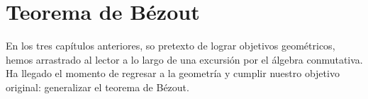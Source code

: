 \chapter{Teorema de Bézout}

\noindent En los tres capítulos anteriores, so pretexto de lograr objetivos geométricos, hemos arrastrado al lector a lo largo de una excursión por el álgebra conmutativa. Ha llegado el momento de regresar a la geometría y cumplir nuestro objetivo original: generalizar el teorema de Bézout.

